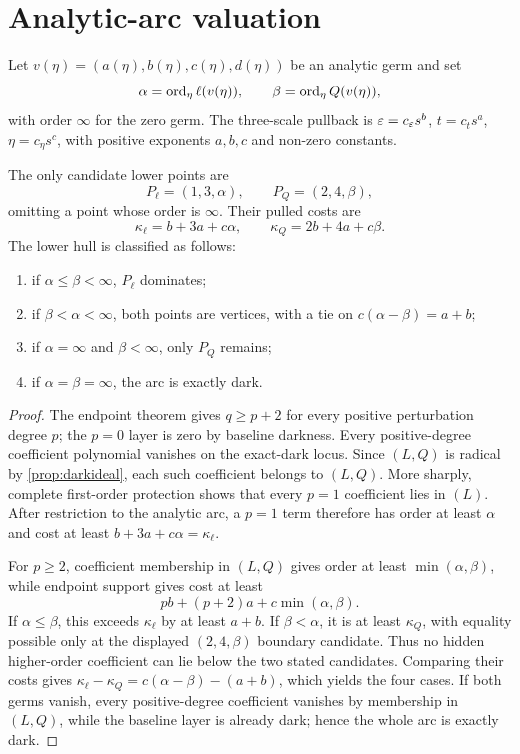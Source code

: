 \section{Analytic-arc valuation}\label{sec:arc1}

Let \(v(\eta)=(a(\eta),b(\eta),c(\eta),d(\eta))\) be an analytic germ and set
\[
\alpha=\operatorname{ord}_\eta\ell(v(\eta)),\qquad
\beta=\operatorname{ord}_\eta Q(v(\eta)),
\]
with order \(\infty\) for the zero germ.  The three-scale pullback is
\(\varepsilon=c_\varepsilon s^b\), \(t=c_t s^a\), \(\eta=c_\eta s^c\), with
positive exponents \(a,b,c\) and non-zero constants.

\begin{theorem}\label{thm:arc}
The only candidate lower points are
\[
P_\ell=(1,3,\alpha),\qquad P_Q=(2,4,\beta),
\]
omitting a point whose order is \(\infty\).  Their pulled costs are
\[
\kappa_\ell=b+3a+c\alpha,\qquad
\kappa_Q=2b+4a+c\beta.
\]
The lower hull is classified as follows:
\begin{enumerate}[label=(\roman*)]
\item if \(\alpha\le\beta<\infty\), \(P_\ell\) dominates;
\item if \(\beta<\alpha<\infty\), both points are vertices, with a tie on
      \(c(\alpha-\beta)=a+b\);
\item if \(\alpha=\infty\) and \(\beta<\infty\), only \(P_Q\) remains;
\item if \(\alpha=\beta=\infty\), the arc is exactly dark.
\end{enumerate}
\end{theorem}
\begin{proof}
The endpoint theorem gives \(q\ge p+2\) for every positive perturbation degree
\(p\); the \(p=0\) layer is zero by baseline darkness.  Every positive-degree
coefficient polynomial vanishes on the exact-dark locus.  Since
\((L,Q)\) is radical by \cref{prop:darkideal}, each such coefficient belongs to
\((L,Q)\).  More sharply, complete first-order protection shows that every
\(p=1\) coefficient lies in \((L)\).  After restriction to the analytic arc,
a \(p=1\) term therefore has order at least \(\alpha\) and cost at least
\(b+3a+c\alpha=\kappa_\ell\).

For \(p\ge2\), coefficient membership in \((L,Q)\) gives order at least
\(\min(\alpha,\beta)\), while endpoint support gives cost at least
\[
pb+(p+2)a+c\min(\alpha,\beta).
\]
If \(\alpha\le\beta\), this exceeds \(\kappa_\ell\) by at least \(a+b\).
If \(\beta<\alpha\), it is at least \(\kappa_Q\), with equality possible only
at the displayed \((2,4,\beta)\) boundary candidate.  Thus no hidden
higher-order coefficient can lie below the two stated candidates.  Comparing
their costs gives
\(\kappa_\ell-\kappa_Q=c(\alpha-\beta)-(a+b)\), which yields the four cases.
If both germs vanish, every positive-degree coefficient vanishes by membership
in \((L,Q)\), while the baseline layer is already dark; hence the whole arc is
exactly dark.
\end{proof}

